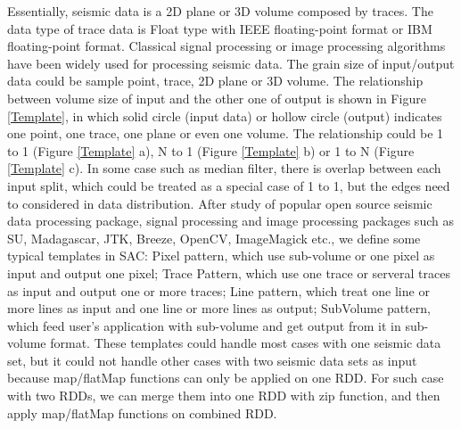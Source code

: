 
Essentially, seismic data is a 2D plane or 3D volume composed by traces. The data type of trace data is Float type with IEEE floating-point format or IBM floating-point format. Classical signal processing or image processing algorithms have been widely used for processing seismic data. The grain size of input/output data could be sample point, trace, 2D plane or 3D volume. The relationship between volume size of input and the other one of output is shown in Figure \ref{Template}, in which solid circle (input data) or hollow circle (output) indicates one point, one trace, one plane or even one volume. The relationship could be 1 to 1 (Figure \ref{Template} a), N to 1 (Figure \ref{Template} b) or 1 to N (Figure \ref{Template} c). In some case such as median filter, there is overlap between each input split, which could be treated as a special case of 1 to 1, but the edges need to considered in data distribution. After study of popular open source seismic data processing package, signal processing and image processing packages such as SU, Madagascar, JTK, Breeze, OpenCV, ImageMagick etc., we define some typical templates in SAC: Pixel pattern, which use sub-volume or one pixel as input and output one pixel; Trace Pattern, which use one trace or serveral traces as input and output one or more traces; Line pattern, which treat one line or more lines as input and one line or more lines as output; SubVolume pattern, which feed user’s application with sub-volume and get output from it in sub-volume format. These templates could handle most cases with one seismic data set, but it could not handle other cases with two seismic data sets as input because map/flatMap functions can only be applied on one RDD. For such case with two RDDs, we can merge them into one RDD with zip function, and then apply map/flatMap functions on combined RDD. 

